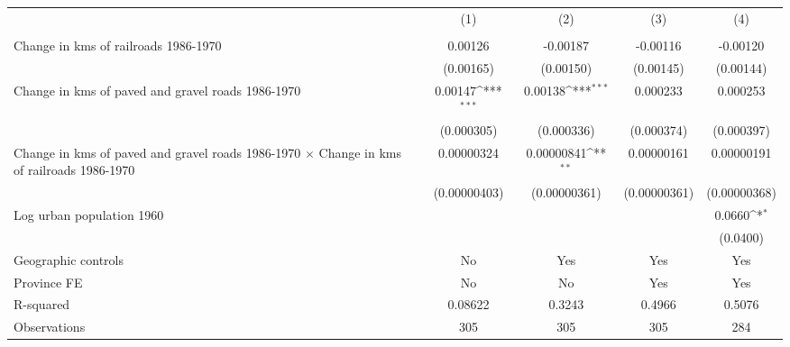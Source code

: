 {
\def\sym#1{\ifmmode^{#1}\else\(^{#1}\)\fi}
\begin{tabular}{l*{4}{c}}
\hline\hline
                &\multicolumn{1}{c}{(1)}&\multicolumn{1}{c}{(2)}&\multicolumn{1}{c}{(3)}&\multicolumn{1}{c}{(4)}\\
                &\multicolumn{1}{c}{}&\multicolumn{1}{c}{}&\multicolumn{1}{c}{}&\multicolumn{1}{c}{}\\
\hline
Change in kms of railroads 1986-1970&  0.00126         & -0.00187         & -0.00116         & -0.00120         \\
                &(0.00165)         &(0.00150)         &(0.00145)         &(0.00144)         \\
[1em]
Change in kms of paved and gravel roads 1986-1970&  0.00147\sym{***}&  0.00138\sym{***}& 0.000233         & 0.000253         \\
                &(0.000305)         &(0.000336)         &(0.000374)         &(0.000397)         \\
[1em]
Change in kms of paved and gravel roads 1986-1970 $\times$ Change in kms of railroads 1986-1970&0.00000324         &0.00000841\sym{**} &0.00000161         &0.00000191         \\
                &(0.00000403)         &(0.00000361)         &(0.00000361)         &(0.00000368)         \\
[1em]
Log urban population 1960&                  &                  &                  &   0.0660\sym{*}  \\
                &                  &                  &                  & (0.0400)         \\
\hline
Geographic controls&       No         &      Yes         &      Yes         &      Yes         \\
Province FE     &       No         &       No         &      Yes         &      Yes         \\
R-squared       &  0.08622         &   0.3243         &   0.4966         &   0.5076         \\
Observations    &      305         &      305         &      305         &      284         \\
\hline\hline
\end{tabular}
}
